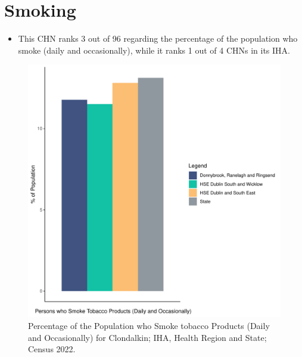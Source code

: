 \documentclass{article}
\begin{document}
\pagebreak

\section{Smoking}\label{sect:Smoking}
\begin{itemize}
\item This CHN ranks  3 out of 96 regarding the percentage of the population who smoke (daily and occasionally), while it ranks   1 out of 4 CHNs in its IHA.
\end{itemize}
\begin{figure}[H]
	\centering
	\includegraphics[width = 120mm]{../figures/SmokingED.pdf}
	\caption{Percentage of the Population who Smoke tobacco Products (Daily and Occasionally) for Clondalkin; IHA, Health Region and State; Census 2022.}
	\label{fig:2ae19629-1a6a-13a3-e055-000000000001}
	\end{figure}
	
\end{document}
